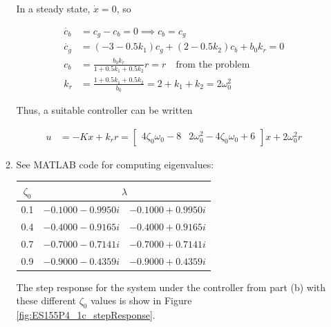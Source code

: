 \documentclass[11pt]{article}
\theoremstyle{definition}
\begin{document}
\begin{enumerate}
\begin{enumerate}
        In a steady state, $\dot{x} = 0$, so

        \begin{align*}
            \dot{c_b} &= c_g - c_b  = 0\implies c_b = c_g \\
            \dot{c_g} &= (-3 - 0.5k_1)c_g + (2 - 0.5k_2)c_b + b_0 k_r = 0 \\
            c_b &= \frac{b_0 k_r}{1 + 0.5k_1 + 0.5k_2}r = r \quad \text{from the problem}\\
            k_r &= \frac{1 + 0.5k_1 + 0.5k_2}{b_0} = 2 + k_1 + k_2 = 2 \omega_0^2
        \end{align*}

        Thus, a suitable controller can be written

        \begin{align*}
            u &= -Kx + k_r r = \begin{bmatrix} 4 \zeta_0 \omega_0 - 8 & 2 \omega_0^2 -4 \zeta_0 \omega_0 + 6 \end{bmatrix}x + 2 \omega_0^2 r
        \end{align*}        

        \item %
        See MATLAB code for computing eigenvalues:

        \begin{center}
        \begin{tabular}{c | c c}
            $\zeta_0$ & \multicolumn{2}{c}{$\lambda$} \\
            \hline
            0.1 & $-0.1000 - 0.9950i$ & $-0.1000 + 0.9950i$ \\
            0.4 & $-0.4000 - 0.9165i$ & $-0.4000 + 0.9165i$ \\
            0.7 & $-0.7000 - 0.7141i$ & $-0.7000 + 0.7141i$ \\
            0.9 & $-0.9000 - 0.4359i$ & $-0.9000 + 0.4359i$ \\
        \end{tabular}
        \end{center}

        The step response for the system under the controller from part (b) with these different $\zeta_0$ values is show in Figure \ref{fig:ES155P4_1c_stepResponse}.


\end{enumerate}
\end{enumerate}
\end{document}
